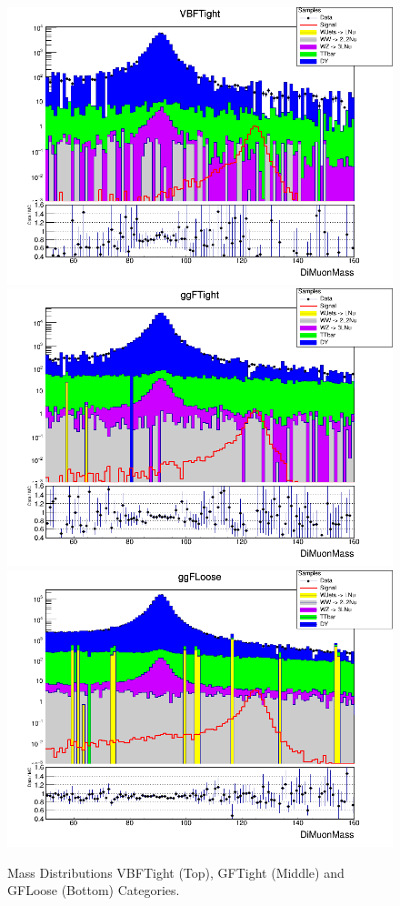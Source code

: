 \begin{figure}[H]
  \centering
  \includegraphics[width=0.65\linewidth]{figures/ch_higgs/distributions/baseline_kalman/distribution__VBFTight__DiMuonMass__logY.png}\\
  \includegraphics[width=0.65\linewidth]{figures/ch_higgs/distributions/baseline_kalman/distribution__ggFTight__DiMuonMass__logY.png}\\
  \includegraphics[width=0.65\linewidth]{figures/ch_higgs/distributions/baseline_kalman/distribution__ggFLoose__DiMuonMass__logY.png}
  \caption{Mass Distributions VBFTight (Top), GFTight (Middle) and GFLoose (Bottom) Categories. }
  \label{fig:higgs_categorization_2jetsall}
\end{figure}
